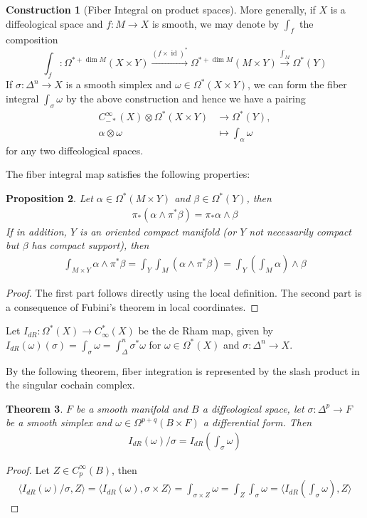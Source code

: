 \documentclass{scrartcl}
\theoremstyle{plain}
\newtheorem{theorem}{Theorem}[section]
\newtheorem{proposition}[theorem]{Proposition}
\theoremstyle{definition}
\newtheorem{construction}[theorem]{Construction}
\let\xto\xrightarrow
\DeclareMathOperator{\id}{id}
\begin{document}
\begin{construction}[Fiber Integral on product spaces]
More generally, if $X$ is a diffeological space and $f\colon M\to X$ is smooth, we may denote by $\int_f$ the composition 
$$\int_f \colon \Omega^{*+\dim M}(X\times Y)\xto{(f\times \id)^*} \Omega^{*+\dim M}(M\times Y) \xto{\int_M} \Omega^*(Y)$$
If $\sigma\colon \Delta^n\to X$ is a smooth simplex and $\omega\in\Omega^*(X\times Y)$, we can form the fiber integral $\int_\sigma \omega$ by the above construction and hence we have a pairing 
\begin{align*}
    C_{-*}^\infty(X)\otimes \Omega^*(X\times Y)&\to \Omega^*(Y), \\
    \alpha\otimes \omega&\mapsto \int_\alpha\omega
\end{align*}
for any two diffeological spaces.

\end{construction}
The fiber integral map satisfies the following properties:
\begin{proposition}
    Let $\alpha\in\Omega^*(M\times Y)$ and $\beta\in\Omega^*(Y)$, then
    \begin{align*}
        \pi_*(\alpha\wedge\pi^*\beta) = \pi_*\alpha\wedge\beta
    \end{align*}
    If in addition, $Y$ is an oriented compact manifold (or $Y$ not necessarily compact but $\beta$ has compact support), then
    \begin{align*}
        \int_{M\times Y} \alpha\wedge\pi^*\beta = \int_Y\int_M \left(\alpha\wedge\pi^*\beta\right) =  \int_Y\left(\int_M \alpha\right)\wedge\beta
    \end{align*}
\end{proposition}
\begin{proof}
    The first part follows directly using the local definition. The second part is a consequence of Fubini's theorem in local coordinates. 
\end{proof}

Let $I_{dR}\colon \Omega^*(X)\to C_\infty^*(X)$ be the de Rham map, given by $I_{dR}(\omega)(\sigma) = \int_\sigma \omega = \int_\Delta^n \sigma^*\omega$ for $\omega\in\Omega^*(X)$ and $\sigma\colon\Delta^n\to X$. 

By the following theorem, fiber integration is represented by the slash product in the singular cochain complex.
\begin{theorem}\label{thm:fiber-integral-slash-product}
    $F$ be a smooth manifold and $B$ a diffeological space, let $\sigma\colon\Delta^p\to F$ be a smooth simplex and $\omega\in\Omega^{p+q}(B\times F)$ a differential form. Then
    \begin{align*}
        I_{dR}(\omega) / \sigma = I_{dR}\left(\int_{\sigma} \omega\right)
    \end{align*}
\end{theorem}
\begin{proof}
    Let $Z\in C^\infty_p(B)$, then
    \begin{align*}
        \langle I_{dR}(\omega) / \sigma, Z\rangle = \langle I_{dR}(\omega), \sigma\times Z\rangle = \int_{\sigma\times Z} \omega = \int_Z \int_\sigma\omega = \langle I_{dR}\left(\int_{\sigma}\omega\right), Z\rangle
    \end{align*}
\end{proof}
\end{document}

